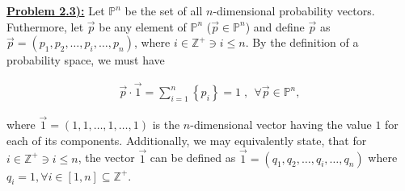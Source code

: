\documentclass{article}[12pt]
\numberwithin{equation}{subsection}
\newcommand{\prob}[1]{\textbf{\underline{Problem #1):}}}
\begin{document}
\begin{flushleft}



\prob{2.3}  Let $\mathbb{P}^n$ be the set of all $n$-dimensional probability vectors.  Futhermore, let $\vec{p}$ be any element of $\mathbb{P}^n$ ($\vec{p} \in \mathbb{P}^n$) and define $\vec{p}$ as $\vec{p} = \left( p_1, p_2, \dots, p_i, \dots, p_n \right)$, where $i \in \mathbb{Z}^+ \ni i \leq n$.  By the definition of a probability space, we must have

\begin{align*} \label{c2p3eq1}
\vec{p} \cdot \vec{1} = \sum_{i=1}^n \left\{ p_i \right\} = 1  \; , \; \, \forall \vec{p} \in \mathbb{P}^n, \tag{2.3-1}
\end{align*}

where $\vec{1} = \left( 1, 1, \dots, 1, \dots, 1 \right)$ is the $n$-dimensional vector having the value $1$ for each of its components.  Additionally, we may equivalently state, that for $i \in \mathbb{Z}^+ \ni i \leq n$, the vector $\vec{1}$ can be defined as $\vec{1} = \left( q_1, q_2, \dots, q_i, \dots, q_n \right)$ where $q_i = 1, \forall i \in [1, n] \subseteq \mathbb{Z}^+$. \newline


\end{flushleft}
\end{document}
